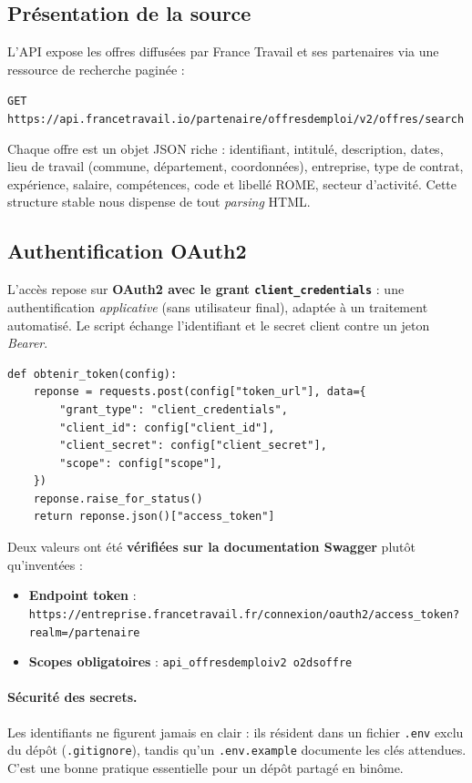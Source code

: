 \documentclass[11pt,a4paper]{article}
\begin{document}
\subsection{Présentation de la source}

L'API expose les offres diffusées par France Travail et ses partenaires via une
ressource de recherche paginée :
\begin{center}
\texttt{GET https://api.francetravail.io/partenaire/offresdemploi/v2/offres/search}
\end{center}
Chaque offre est un objet JSON riche : identifiant, intitulé, description, dates,
lieu de travail (commune, département, coordonnées), entreprise, type de contrat,
expérience, salaire, compétences, code et libellé ROME, secteur d'activité. Cette
structure stable nous dispense de tout \emph{parsing} HTML.

\subsection{Authentification OAuth2}

L'accès repose sur \textbf{OAuth2 avec le grant \texttt{client\_credentials}} :
une authentification \emph{applicative} (sans utilisateur final), adaptée à un
traitement automatisé. Le script échange l'identifiant et le secret client contre
un jeton \emph{Bearer}.

\begin{lstlisting}
def obtenir_token(config):
    reponse = requests.post(config["token_url"], data={
        "grant_type": "client_credentials",
        "client_id": config["client_id"],
        "client_secret": config["client_secret"],
        "scope": config["scope"],
    })
    reponse.raise_for_status()
    return reponse.json()["access_token"]
\end{lstlisting}

Deux valeurs ont été \textbf{vérifiées sur la documentation Swagger} plutôt
qu'inventées :
\begin{itemize}
  \item \textbf{Endpoint token} :
  \texttt{https://entreprise.francetravail.fr/connexion/oauth2/access\_token?realm=/partenaire}
  \item \textbf{Scopes obligatoires} : \texttt{api\_offresdemploiv2 o2dsoffre}
\end{itemize}

\paragraph{Sécurité des secrets.} Les identifiants ne figurent jamais en clair :
ils résident dans un fichier \texttt{.env} exclu du dépôt (\texttt{.gitignore}),
tandis qu'un \texttt{.env.example} documente les clés attendues. C'est une bonne
pratique essentielle pour un dépôt partagé en binôme.
\end{document}
